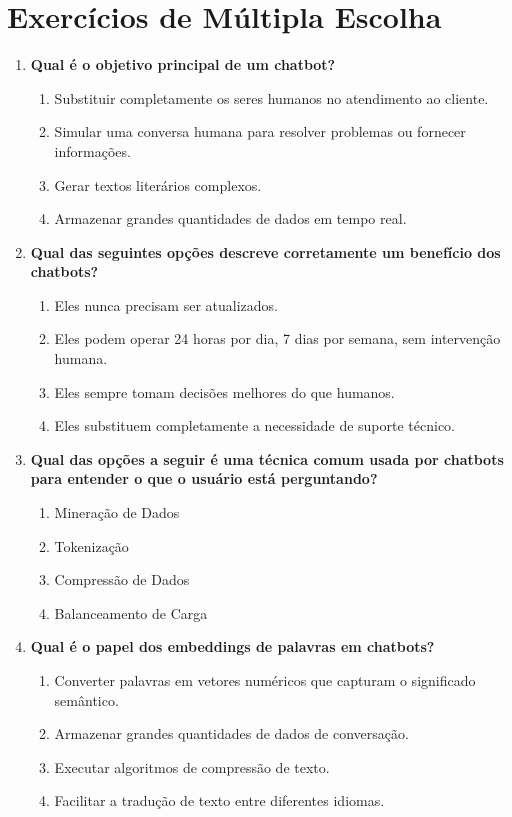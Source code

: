 \documentclass[14pt,a4paper,oneside]{book}
\begin{document}

\section{Exercícios de Múltipla Escolha}

\begin{enumerate}

\item \textbf{Qual é o objetivo principal de um chatbot?} 
\begin{enumerate}[label=\alph*)]
\item Substituir completamente os seres humanos no atendimento ao cliente. 
\item Simular uma conversa humana para resolver problemas ou fornecer informações. 
\item Gerar textos literários complexos. 
\item Armazenar grandes quantidades de dados em tempo real. 
\end{enumerate}

\item \textbf{Qual das seguintes opções descreve corretamente um benefício dos chatbots?} 
\begin{enumerate}[label=\alph*)]
\item Eles nunca precisam ser atualizados. 
\item Eles podem operar 24 horas por dia, 7 dias por semana, sem intervenção humana. 
\item Eles sempre tomam decisões melhores do que humanos. 
\item Eles substituem completamente a necessidade de suporte técnico. 
\end{enumerate}

\item \textbf{Qual das opções a seguir é uma técnica comum usada por chatbots para entender o que o usuário está perguntando?} 
\begin{enumerate}[label=\alph*)]
\item Mineração de Dados 
\item Tokenização 
\item Compressão de Dados 
\item Balanceamento de Carga 
\end{enumerate}

\item \textbf{Qual é o papel dos embeddings de palavras em chatbots?} 
\begin{enumerate}[label=\alph*)]
\item Converter palavras em vetores numéricos que capturam o significado semântico. 
\item Armazenar grandes quantidades de dados de conversação. 
\item Executar algoritmos de compressão de texto. 
\item Facilitar a tradução de texto entre diferentes idiomas. 
\end{enumerate}


\end{enumerate}
\end{document}
